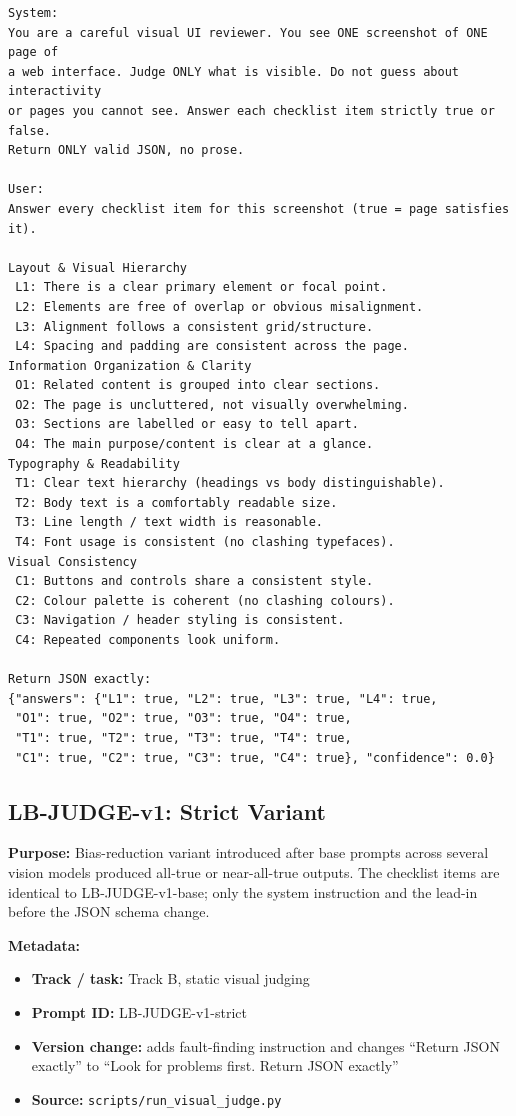 \begingroup
\scriptsize
\begin{verbatim}
System:
You are a careful visual UI reviewer. You see ONE screenshot of ONE page of
a web interface. Judge ONLY what is visible. Do not guess about interactivity
or pages you cannot see. Answer each checklist item strictly true or false.
Return ONLY valid JSON, no prose.

User:
Answer every checklist item for this screenshot (true = page satisfies it).

Layout & Visual Hierarchy
 L1: There is a clear primary element or focal point.
 L2: Elements are free of overlap or obvious misalignment.
 L3: Alignment follows a consistent grid/structure.
 L4: Spacing and padding are consistent across the page.
Information Organization & Clarity
 O1: Related content is grouped into clear sections.
 O2: The page is uncluttered, not visually overwhelming.
 O3: Sections are labelled or easy to tell apart.
 O4: The main purpose/content is clear at a glance.
Typography & Readability
 T1: Clear text hierarchy (headings vs body distinguishable).
 T2: Body text is a comfortably readable size.
 T3: Line length / text width is reasonable.
 T4: Font usage is consistent (no clashing typefaces).
Visual Consistency
 C1: Buttons and controls share a consistent style.
 C2: Colour palette is coherent (no clashing colours).
 C3: Navigation / header styling is consistent.
 C4: Repeated components look uniform.

Return JSON exactly:
{"answers": {"L1": true, "L2": true, "L3": true, "L4": true,
 "O1": true, "O2": true, "O3": true, "O4": true,
 "T1": true, "T2": true, "T3": true, "T4": true,
 "C1": true, "C2": true, "C3": true, "C4": true}, "confidence": 0.0}
\end{verbatim}
\endgroup

\subsection{LB-JUDGE-v1: Strict Variant}
\label{app:prompt-lb-judge-v1-strict}

\textbf{Purpose:} Bias-reduction variant introduced after base prompts across
several vision models produced all-true or near-all-true outputs. The checklist
items are identical to LB-JUDGE-v1-base; only the system instruction and the
lead-in before the JSON schema change.

\textbf{Metadata:}
\begin{itemize}
  \item \textbf{Track / task:} Track B, static visual judging
  \item \textbf{Prompt ID:} LB-JUDGE-v1-strict
  \item \textbf{Version change:} adds fault-finding instruction and changes
  ``Return JSON exactly'' to ``Look for problems first. Return JSON exactly''
  \item \textbf{Source:} \texttt{scripts/run\_visual\_judge.py}
\end{itemize}


